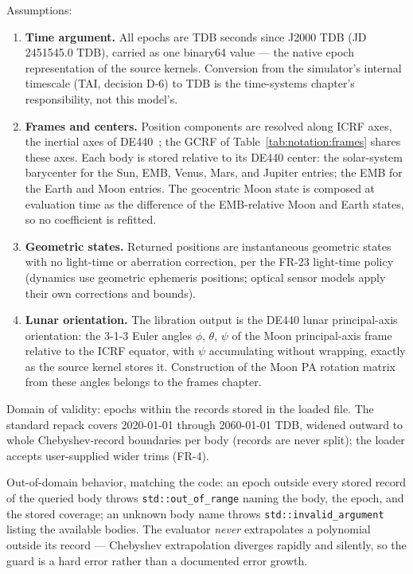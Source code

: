 Assumptions:
\begin{enumerate}
  \item \textbf{Time argument.} All epochs are TDB seconds since J2000 TDB
    (JD 2451545.0 TDB), carried as one binary64 value --- the native epoch
    representation of the source kernels. Conversion from the simulator's
    internal timescale (TAI, decision D-6) to TDB is the time-systems
    chapter's responsibility, not this model's.
  \item \textbf{Frames and centers.} Position components are resolved along
    ICRF axes, the inertial axes of DE440~\cite{park2021}; the GCRF of
    Table~\ref{tab:notation:frames} shares these axes. Each body is stored
    relative to its DE440 center: the solar-system barycenter for the Sun,
    EMB, Venus, Mars, and Jupiter entries; the EMB for the Earth and Moon
    entries. The geocentric Moon state is composed at evaluation time as the
    difference of the EMB-relative Moon and Earth states, so no coefficient
    is refitted.
  \item \textbf{Geometric states.} Returned positions are instantaneous
    geometric states with no light-time or aberration correction, per the
    FR-23 light-time policy (dynamics use geometric ephemeris positions;
    optical sensor models apply their own corrections and bounds).
  \item \textbf{Lunar orientation.} The libration output is the DE440 lunar
    principal-axis orientation: the 3-1-3 Euler angles $\phi$, $\theta$,
    $\psi$ of the Moon principal-axis frame relative to the ICRF equator,
    with $\psi$ accumulating without wrapping, exactly as the source kernel
    stores it. Construction of the Moon PA rotation matrix from these angles
    belongs to the frames chapter.
\end{enumerate}

Domain of validity: epochs within the records stored in the loaded file.
The standard repack covers 2020-01-01 through 2060-01-01 TDB, widened
outward to whole Chebyshev-record boundaries per body (records are never
split); the loader accepts user-supplied wider trims (FR-4).

Out-of-domain behavior, matching the code: an epoch outside every stored
record of the queried body throws \texttt{std::out\_of\_range} naming the
body, the epoch, and the stored coverage; an unknown body name throws
\texttt{std::invalid\_argument} listing the available bodies. The evaluator
\emph{never} extrapolates a polynomial outside its record --- Chebyshev
extrapolation diverges rapidly and silently, so the guard is a hard error
rather than a documented error growth.


